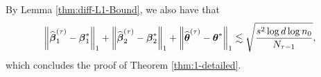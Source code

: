   By Lemma \ref{thm:diff-L1-Bound}, we also have that
$$
 	\left\lVert\widehat{\boldsymbol{\beta}}_1^{(\tau)} - \boldsymbol{\beta}_1^*\right\rVert_1 + \left\lVert\widehat{\boldsymbol{\beta}}_2^{(\tau)} - \boldsymbol{\beta}_2^*\right\rVert_1 + \left\lVert\widehat{\boldsymbol{\theta}}^{(\tau)} - \boldsymbol{\theta}^*\right\rVert_1
 	\lesssim
 	\sqrt{\frac{s^2\log d \log n_0}{N_{\tau-1}}},
$$ which concludes the proof of Theorem \ref{thm:1-detailed}.





